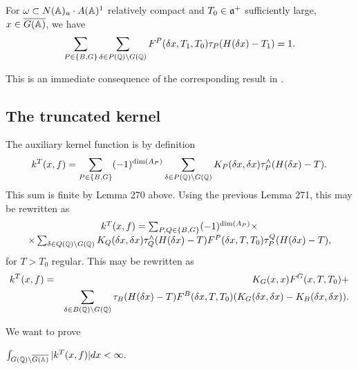 \begin{lemma}
For $\omega \subset N({\Bbb{A}})_u\cdot A({\Bbb{A}})^1$ relatively
compact and
$T_0\in {\frak{a}}^{+}$ sufficiently large,
$x\in \overline{G({\Bbb{A}})}$, we
have 
\[
\sum_{P\in \{B,G\}}
\sum_{\delta \in P({\Bbb{Q}})\backslash G({\Bbb{Q}})}
F^P(\delta x,T_1,T_0)\tau _P(H(\delta x)-T_1)=1.
\]
\end{lemma}

This is an immediate consequence of the corresponding result in \cite{A2}.

\subsection{The truncated kernel}

The auxiliary kernel function is by definition 
\[
k^T(x,f)=\sum_{P\in \{B,G\}}(-1)^{\dim (A_P)}
\sum_{\delta \in P({\Bbb{Q}})\backslash G({\Bbb{Q}})}
K_P(\delta x,\delta x)\tau _P^{\wedge }(H(\delta x)-T). 
\]
This sum is finite by Lemma 270 above. Using the previous Lemma 271,
this may be rewritten as 
\begin{equation}
\begin{array}{c}
k^T(x,f)
=\sum_{P,Q\in \{B,G\}}(-1)^{\dim (A_P)}\times \\
\times
\sum_{\delta \in Q({\Bbb{Q}})\backslash G({\Bbb{Q}})}
K_Q(\delta x,\delta x)\tau _Q^{\wedge }(H(\delta x)-T)
F^P(\delta x,T,T_0)\tau _P^Q(H(\delta x)-T),
\end{array}
\end{equation}
for $T>T_0$ regular. This may be rewritten as
\begin{eqnarray}
k^T(x,f) &=&K_G(x,x)F^G(x,T,T_0)+ \\
&&\sum_{\delta \in B({\Bbb{Q}})\backslash G({\Bbb{Q}})}
\tau _B(H(\delta x)-T)
F^B(\delta x,T,T_0)(K_G(\delta x,\delta x)-K_B(\delta x,\delta x)). 
\nonumber
\end{eqnarray}

We want to prove

\begin{lemma}
$\int_{G({\Bbb{Q}})\backslash \overline{G({\Bbb{A}})}}|k^T(x,f)|dx<\infty .$
\end{lemma}

